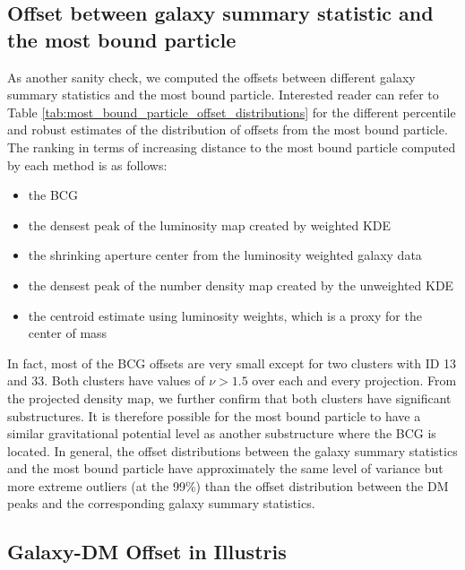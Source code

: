 \subsection{Offset between galaxy summary statistic and the most bound particle}
As another sanity check, we computed the offsets between different galaxy summary
statistics and the most bound particle. 
Interested reader can refer to Table
\ref{tab:most_bound_particle_offset_distributions} for the different
percentile and robust estimates of the distribution of offsets from the most bound 
particle. 
The ranking in terms of increasing distance 
to the most bound particle computed by each method is as follows:
\begin{itemize}
	\item the BCG 
	\item the densest peak of the luminosity map created by weighted KDE 
		\item the shrinking aperture center from the luminosity weighted galaxy data
		\item the densest peak of the number density map created by the unweighted KDE 
		\item the centroid estimate using luminosity weights, which is a proxy for the
			center of mass
\end{itemize}

In fact, most of the BCG offsets are very small except for two clusters with ID 13
and 33. Both clusters have  values of $\nu > 1.5 $ over each and every projection. 
From the projected density map, we further confirm that
both clusters have significant substructures. It is therefore possible for the
most bound particle to have a similar gravitational potential level as another 
substructure where the BCG is located. 
In general, the offset distributions between the galaxy summary statistics and
the most bound particle have approximately the same level of variance but more
extreme outliers (at the 99\%) than the
offset distribution between the DM peaks and the corresponding galaxy summary
statistics.

\subsection{Galaxy-DM Offset in Illustris}
\label{subsec:galaxyDMoffset}
